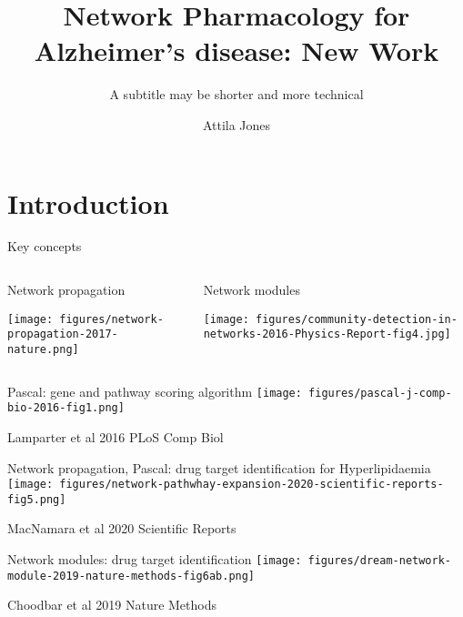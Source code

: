\documentclass[aspectratio=169]{beamer}
\title{Network Pharmacology for Alzheimer's disease: New Work}
\subtitle{A subtitle may be shorter and more technical}
\author{Attila Jones}
\date{}
\begin{document}
\section{Introduction}

\begin{frame}{Key concepts}
\begin{columns}[t]
\begin{column}{0.6\textwidth}
\begin{center}
  Network propagation

\texttt{[image: figures/network-propagation-2017-nature.png]}
\end{center}
\end{column}

\begin{column}{0.4\textwidth}
\begin{center}
  Network modules

\texttt{[image: figures/community-detection-in-networks-2016-Physics-Report-fig4.jpg]}
\end{center}
\end{column}
\end{columns}
\end{frame}

\begin{frame}[label=pascal]{Pascal: gene and pathway scoring algorithm}
\texttt{[image: figures/pascal-j-comp-bio-2016-fig1.png]}

{\tiny Lamparter et al 2016 PLoS Comp Biol}
\end{frame}


\begin{frame}{Network propagation, Pascal: drug target identification for Hyperlipidaemia}
\texttt{[image: figures/network-pathwhay-expansion-2020-scientific-reports-fig5.png]}

{\tiny MacNamara et al 2020 Scientific Reports}
\end{frame}

\begin{frame}{Network modules: drug target identification}
  \texttt{[image: figures/dream-network-module-2019-nature-methods-fig6ab.png]}

{\tiny Choodbar et al 2019 Nature Methods}
\end{frame}
\end{document}
